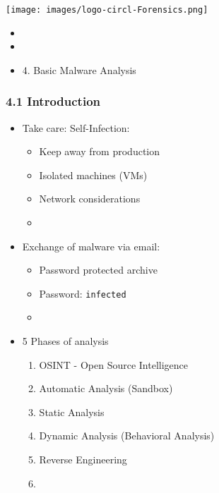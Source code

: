 %
%



\begin{frame}
    \texttt{[image: images/logo-circl-Forensics.png]}
    \begin{itemize}
        \item[]
        \item[]
        \item[] 4. Basic Malware Analysis
    \end{itemize}
\end{frame}


\begin{frame}[fragile]
  \frametitle{4.1 Introduction}
    \begin{itemize}
	    \item[] Take care: Self-Infection:
    	    \begin{itemize}
	    	\item Keep away from production
		\item Isolated machines (VMs)
		\item Network considerations
		\item[]
    	    \end{itemize}
	    \item[] Exchange of malware via email:
    	    \begin{itemize}
	    	\item Password protected archive
		\item Password: \texttt{infected}
		\item[]
    	    \end{itemize}
	    \item[] 5 Phases of analysis
            \begin{enumerate}
            	\item OSINT - Open Source Intelligence
		\item Automatic Analysis (Sandbox)
            	\item Static Analysis
		\item Dynamic Analysis (Behavioral Analysis)
            	\item Reverse Engineering
		\item[]
            \end{enumerate}
    \end{itemize}
\end{frame}



